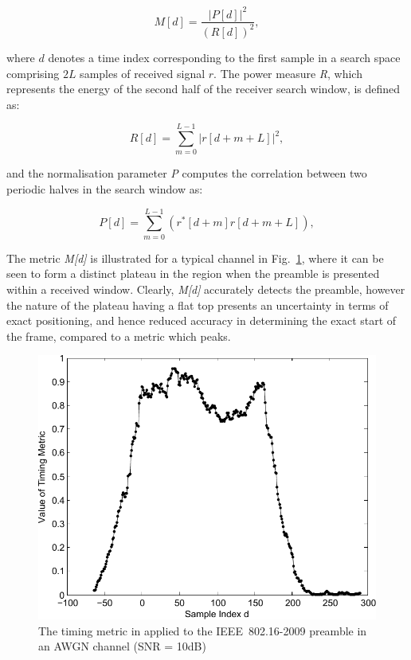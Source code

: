 \begin{center}
\begin{equation}
\label{MMetric}
M[d] = \frac{|P[d]|^2} {(R[d])^2},
\end{equation}
\end{center}

where $d$ denotes a time index corresponding to the first sample in a search space comprising $2L$ samples of received signal $r$. The power measure \emph{R}, which represents the energy of the second half of the receiver search window, is defined as:

\begin{center}
\begin{equation}
\label{RMetric}
R[d] =\sum_{m =0}^{L-1}   |r[d+m+L]|^2,
\end{equation}
\end{center}

and the normalisation parameter \emph{P} computes the correlation between two periodic halves in the search window as:

\begin{center}
\begin{equation}
\label{PMetric}
P[d] =\sum_{m =0}^{L-1}    (r^{*}[d+m] r[d+m+L] ),
\end{equation}
\end{center}


The metric \emph{M[d]} is illustrated for a typical channel in Fig.~\ref{fig:M1-10dB}, where it can be seen to form a distinct plateau in the region when the preamble is presented within a received window.
Clearly, \emph{M[d]} accurately detects the preamble, however the nature of the plateau having a flat top presents an uncertainty in terms of exact positioning, and hence reduced accuracy in determining the exact start of the frame, compared to a metric which peaks.

\begin{figure}
	\centerline{\includegraphics [width=0.8\columnwidth] {figures/M1_10dB.pdf} }
	\caption{The timing metric in \cite{Schmidl1997} applied to the IEEE~802.16-2009 preamble in an AWGN channel (SNR = 10dB)}
	\label{fig:M1-10dB}
\end{figure}

